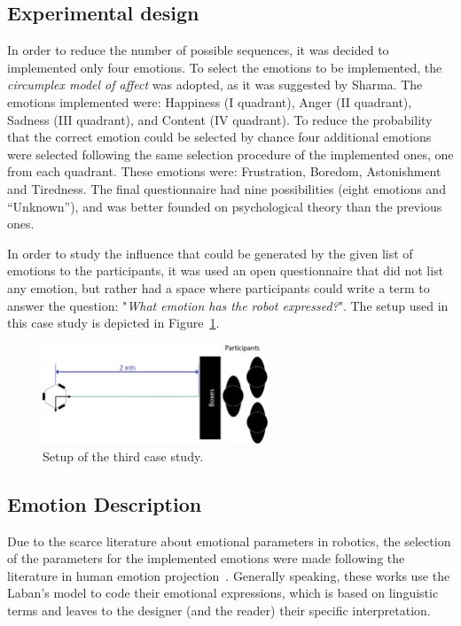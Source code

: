 \subsection{Experimental design}

In order to reduce the number of possible sequences, it was decided to implemented only four emotions. To select the emotions to be implemented, the \textit{circumplex model of affect} was adopted, as it was suggested by Sharma. The emotions implemented were: Happiness (I quadrant), Anger (II quadrant), Sadness (III quadrant), and Content (IV quadrant). To reduce the probability that the correct emotion could be selected by chance four additional emotions were selected following the same selection procedure of the implemented ones, one from each quadrant. These emotions were: Frustration, Boredom, Astonishment and Tiredness. The final questionnaire had nine possibilities (eight emotions and ``Unknown''), and was better founded on psychological theory than the previous ones. 

In order to study the influence that could be generated by the given list of emotions to the participants, it was used an open questionnaire that did not list any emotion, but rather had a space where participants could write a term to answer the question: "\textit{What emotion has the robot expressed?}".
The setup used in this case study is depicted in Figure~\ref{fig:setup2}.

\begin{figure}[h]
	\centering
	\includegraphics[width=0.6\textwidth]{./Images/ThirdCase.png} 
	\caption{Setup of the third case study.}
	\label{fig:setup2} 
\end{figure}

\subsection{Emotion Description} 

Due to the scarce literature about emotional parameters in robotics, the selection of the parameters for the implemented emotions were made following the literature in human emotion projection~\cite{Nadia2013, Crane2013}.
Generally speaking, these works use the Laban's model to code their emotional expressions, which is based on linguistic terms and leaves to the designer (and the reader) their specific interpretation.


